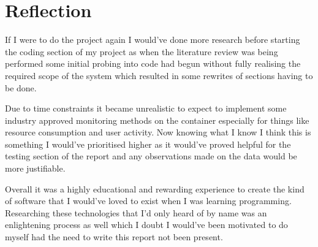 \documentclass[12pt, a4paper]{extreport}
\begin{document}
\pagebreak

\chapter{Reflection}

If I were to do the project again I would've done more research before starting the coding section of my project as when the literature review was being performed some initial probing into code had begun without fully realising the required scope of the system which resulted in some rewrites of sections having to be done.

Due to time constraints it became unrealistic to expect to implement some industry approved monitoring methods on the container especially for things like resource consumption and user activity. Now knowing what I know I think this is something I would've prioritised higher as it would've proved helpful for the testing section of the report and any observations made on the data would be more justifiable.

Overall it was a highly educational and rewarding experience to create the kind of software that I would've loved to exist when I was learning programming. Researching these technologies that I'd only heard of by name was an enlightening process as well which I doubt I would've been motivated to do myself had the need to write this report not been present.

\printbibliography

\pagebreak


% 
\end{document}
